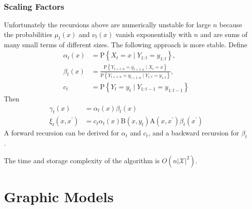 \documentclass[11pt,a4paper]{article}
\begin{document}
\subsubsection{Scaling Factors}
Unfortunately the recursions above are numerically unstable for large $n$ because the probabilities $\mu_t(x)$ and $\nu_t(x)$ vanish exponentially with $n$ and are sums of many small terms of different sizes. The following approach is more stable. Define
$$
\begin{aligned}
\alpha_t(x) &=\mathrm{P}\left\{X_t=x \mid Y_{1: t}=y_{1: t}\right\}, \\
\beta_t(x) &=\frac{\mathrm{P}\left\{Y_{t+1: n}=y_{t+1: n} \mid X_t=x\right\}}{\mathrm{P}\left\{Y_{t+1: n}=y_{t+1: n} \mid Y_{1: t}=y_{1: t}\right\}}, \\
c_t &=\mathrm{P}\left\{Y_t=y_t \mid Y_{1: t-1}=y_{1: t-1}\right\}
\end{aligned}
$$
Then
$$
\begin{aligned}
\gamma_t(x) &=\alpha_t(x) \beta_t(x) \\
\xi_t\left(x, x^{\prime}\right) &=c_t \alpha_t(x) \mathrm{B}\left(x, y_t\right) \mathrm{A}\left(x, x^{\prime}\right) \beta_t\left(x^{\prime}\right)
\end{aligned}
$$
A forward recursion can be derived for $\alpha_t$ and $c_t$, and a backward recursion for $\beta_t$.

The time and storage complexity of the algorithm is $O\left(n|\mathcal{X}|^2\right)$.











\section{Graphic Models}
\end{document}
